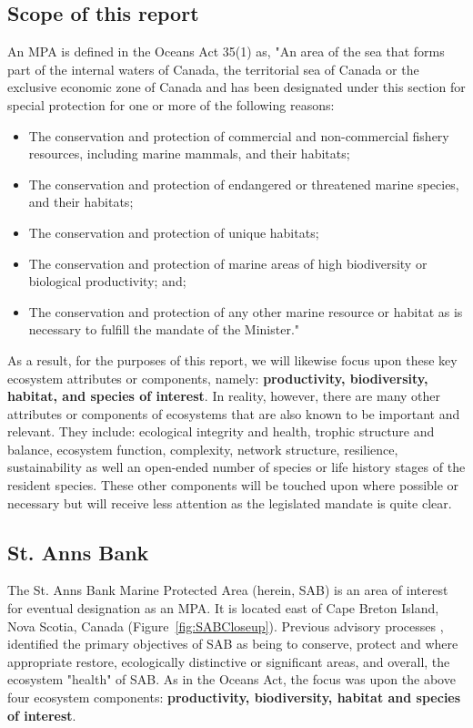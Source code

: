 \documentclass[letterpaper,portrait,11pt]{scrartcl}
\numberwithin{equation}{section}		%
\numberwithin{figure}{section}		%
\numberwithin{table}{section}				%
\begin{document}
\subsection{Scope of this report}
An MPA is defined in the Oceans Act 35(1) as, "An area of the sea that forms part of the internal waters of Canada, the territorial sea of Canada or the exclusive economic zone of Canada and has been designated under this section for special protection for one or more of the following reasons: 

\begin{itemize}
  \item The conservation and protection of commercial and non-commercial fishery resources, including marine mammals, and their habitats; 
  \item The conservation and protection of endangered or threatened marine species, and their habitats; 
  \item The conservation and protection of unique habitats; 
  \item The conservation and protection of marine areas of high biodiversity or biological productivity; and; 
  \item The conservation and protection of any other marine resource or habitat as is necessary to fulfill the mandate of the Minister."
\end{itemize}

As a result, for the purposes of this report, we will likewise focus upon these key ecosystem attributes or components, namely: \textbf{productivity, biodiversity, habitat, and  species of interest}. In reality, however, there are many other attributes or components of ecosystems that are also known to be important and relevant. They include: ecological integrity and health, trophic structure and balance, ecosystem function, complexity, network structure, resilience, sustainability as well an open-ended number of species or life history stages of the resident species. These other components will be touched upon where possible or necessary but will receive less attention as the legislated mandate is quite clear. 

\subsection{St. Anns Bank}
The St. Anns Bank Marine Protected Area (herein, SAB) is an area of interest for eventual designation as an MPA. It is located east of Cape Breton Island, Nova Scotia, Canada (Figure~\ref{fig:SABCloseup}). Previous advisory processes \parencites{DFO:2012:conservation, Kenchington:2013:sab}, identified the primary objectives of SAB as being to conserve, protect and where appropriate restore, ecologically distinctive or significant areas, and overall, the ecosystem "health" of SAB. As in the Oceans Act, the focus was upon the above four ecosystem components: \textbf{productivity, biodiversity, habitat and species of interest}.
\end{document}
